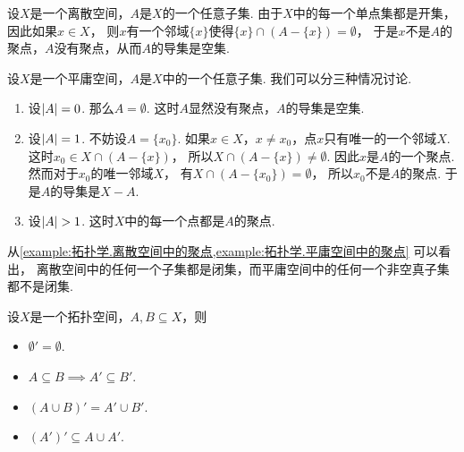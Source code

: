 \begin{example}[离散空间中的聚点]\label{example:拓扑学.离散空间中的聚点}
设\(X\)是一个离散空间，\(A\)是\(X\)的一个任意子集.
由于\(X\)中的每一个单点集都是开集，因此如果\(x \in X\)，
则\(x\)有一个邻域\(\{x\}\)使得\(\{x\}\cap(A-\{x\})=\emptyset\)，
于是\(x\)不是\(A\)的聚点，\(A\)没有聚点，从而\(A\)的导集是空集.
\end{example}

\begin{example}[平庸空间中的聚点]\label{example:拓扑学.平庸空间中的聚点}
设\(X\)是一个平庸空间，\(A\)是\(X\)中的一个任意子集.
我们可以分三种情况讨论.
\begin{enumerate}
	\item 设\(\abs{A} = 0\).
	那么\(A = \emptyset\).
	这时\(A\)显然没有聚点，\(A\)的导集是空集.

	\item 设\(\abs{A} = 1\).
	不妨设\(A = \{x_0\}\).
	如果\(x \in X\)，\(x \neq x_0\)，点\(x\)只有唯一的一个邻域\(X\).
	这时\(x_0 \in X \cap (A - \{x\})\)，
	所以\(X \cap (A - \{x\}) \neq \emptyset\).
	因此\(x\)是\(A\)的一个聚点.
	然而对于\(x_0\)的唯一邻域\(X\)，
	有\(X \cap (A - \{x_0\}) = \emptyset\)，
	所以\(x_0\)不是\(A\)的聚点.
	于是\(A\)的导集是\(X - A\).

	\item 设\(\abs{A} > 1\).
	这时\(X\)中的每一个点都是\(A\)的聚点.
\end{enumerate}
\end{example}

\begin{remark}
从\cref{example:拓扑学.离散空间中的聚点,example:拓扑学.平庸空间中的聚点} 可以看出，
离散空间中的任何一个子集都是闭集，而平庸空间中的任何一个非空真子集都不是闭集.
\end{remark}

\begin{theorem}
设\(X\)是一个拓扑空间，\(A,B \subseteq X\)，则
\begin{itemize}
	\item \(\emptyset' = \emptyset\).
	\item \(A \subseteq B \implies A' \subseteq B'\).
	\item \((A \cup B)' = A' \cup B'\).
	\item \((A')' \subseteq A \cup A'\).
\end{itemize}
\end{theorem}

